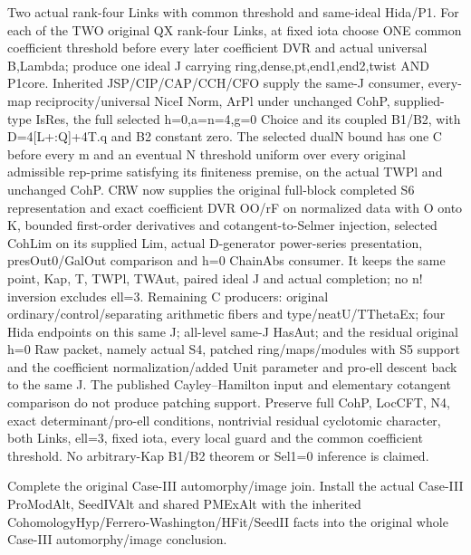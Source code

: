 \begin{description}[style=nextline]
\item[13. COUNT\_II\_SUPPORT --- C] Two actual rank-four Links with common threshold and same-ideal Hida/\allowbreak{}P1. For each of the TWO original QX rank-four Links, at fixed iota choose ONE common coefficient threshold before every later coefficient DVR and actual universal B,Lambda; produce one ideal J carrying ring,dense,pt,end1,end2,twist AND P1core. Inherited JSP/\allowbreak{}CIP/\allowbreak{}CAP/\allowbreak{}CCH/\allowbreak{}CFO supply the same-J consumer, every-map reciprocity/\allowbreak{}universal NiceI Norm, ArPl under unchanged CohP, supplied-type IsRes, the full selected h=0,a=n=4,g=0 Choice and its coupled B1/\allowbreak{}B2, with D=4[L+:Q]+4T.q and B2 constant zero. The selected dualN bound has one C before every m and an eventual N threshold uniform over every original admissible rep-prime satisfying its finiteness premise, on the actual TWPl and unchanged CohP. CRW now supplies the original full-block completed S6 representation and exact coefficient DVR OO/\allowbreak{}rF on normalized data with O onto K, bounded first-order derivatives and cotangent-to-Selmer injection, selected CohLim on its supplied Lim, actual D-generator power-series presentation, presOut0/\allowbreak{}GalOut comparison and h=0 ChainAbs consumer. It keeps the same point, Kap, T, TWPl, TWAut, paired ideal J and actual completion; no n! inversion excludes ell=3. Remaining C producers: original ordinary/\allowbreak{}control/\allowbreak{}separating arithmetic fibers and type/\allowbreak{}neatU/\allowbreak{}TThetaEx; four Hida endpoints on this same J; all-level same-J HasAut; and the residual original h=0 Raw packet, namely actual S4, patched ring/\allowbreak{}maps/\allowbreak{}modules with S5 support and the coefficient normalization/\allowbreak{}added Unit parameter and pro-ell descent back to the same J. The published Cayley–Hamilton input and elementary cotangent comparison do not produce patching support. Preserve full CohP, LocCFT, N4, exact determinant/\allowbreak{}pro-ell conditions, nontrivial residual cyclotomic character, both Links, ell=3, fixed iota, every local guard and the common coefficient threshold. No arbitrary-Kap B1/\allowbreak{}B2 theorem or Sel1=0 inference is claimed.

\item[14. TASK\_CASE3\_AUT\_JOIN --- B] Complete the original Case-III automorphy/\allowbreak{}image join. Install the actual Case-III ProModAlt, SeedIVAlt and shared PMExAlt with the inherited CohomologyHyp/\allowbreak{}Ferrero-Washington/\allowbreak{}HFit/\allowbreak{}SeedII facts into the original whole Case-III automorphy/\allowbreak{}image conclusion.


\end{description}
